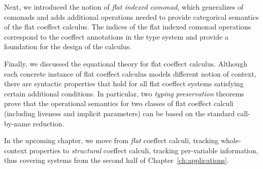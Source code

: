 Next, we introduced the notion of \emph{flat indexed comonad}, which generalizes of comonads
and adds additional operations needed to provide categorical semantics of the flat coeffect 
calculus. The indices of the flat indexed comonad operations correspond to the
coeffect annotations in the type system and provide a foundation for the design of the 
calculus. 

Finally, we discussed the equational theory for flat coeffect calculus. Although each 
concrete instance of flat coeffect calculus models different notion of context, there are
syntactic properties that hold for all flat coeffect systems satisfying certain additional
conditions. In particular, two \emph{typing preservation} theorems prove that the operational
semantics for two classes of flat coeffect calculi (including liveness and implicit parameters) 
can be based on the standard call-by-name reduction.

In the upcoming chapter, we move from \emph{flat} coeffect calculi, tracking whole-context
properties to \emph{structural} coeffect calculi, tracking per-variable information, thus
covering systems from the second half of Chapter~\ref{ch:applications}.